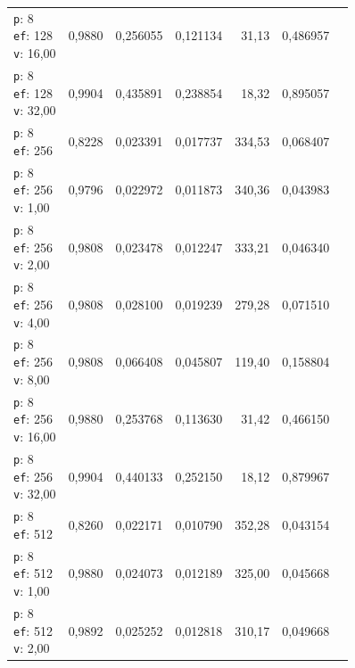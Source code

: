 \begin{table}[htbp]
\begin{tabularx}{\textwidth}{Xrrrrrr}
    \makecell{\texttt{p}: 8\\\texttt{ef}: 128\\\texttt{v}: 16,00} & 0,9880 & 0,256055 & 0,121134 & 31,13 & 0,486957 \\
    \makecell{\texttt{p}: 8\\\texttt{ef}: 128\\\texttt{v}: 32,00} & 0,9904 & 0,435891 & 0,238854 & 18,32 & 0,895057 \\
    \makecell{\texttt{p}: 8\\\texttt{ef}: 256} & 0,8228 & 0,023391 & 0,017737 & 334,53 & 0,068407 \\
    \makecell{\texttt{p}: 8\\\texttt{ef}: 256\\\texttt{v}: 1,00} & 0,9796 & 0,022972 & 0,011873 & 340,36 & 0,043983 \\
    \makecell{\texttt{p}: 8\\\texttt{ef}: 256\\\texttt{v}: 2,00} & 0,9808 & 0,023478 & 0,012247 & 333,21 & 0,046340 \\
    \makecell{\texttt{p}: 8\\\texttt{ef}: 256\\\texttt{v}: 4,00} & 0,9808 & 0,028100 & 0,019239 & 279,28 & 0,071510 \\
    \makecell{\texttt{p}: 8\\\texttt{ef}: 256\\\texttt{v}: 8,00} & 0,9808 & 0,066408 & 0,045807 & 119,40 & 0,158804 \\
    \makecell{\texttt{p}: 8\\\texttt{ef}: 256\\\texttt{v}: 16,00} & 0,9880 & 0,253768 & 0,113630 & 31,42 & 0,466150 \\
    \makecell{\texttt{p}: 8\\\texttt{ef}: 256\\\texttt{v}: 32,00} & 0,9904 & 0,440133 & 0,252150 & 18,12 & 0,879967 \\
    \makecell{\texttt{p}: 8\\\texttt{ef}: 512} & 0,8260 & 0,022171 & 0,010790 & 352,28 & 0,043154 \\
    \makecell{\texttt{p}: 8\\\texttt{ef}: 512\\\texttt{v}: 1,00} & 0,9880 & 0,024073 & 0,012189 & 325,00 & 0,045668 \\
    \makecell{\texttt{p}: 8\\\texttt{ef}: 512\\\texttt{v}: 2,00} & 0,9892 & 0,025252 & 0,012818 & 310,17 & 0,049668 \\

\end{tabularx}
\end{table}
